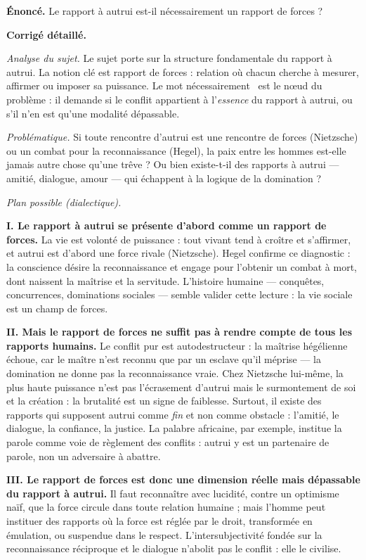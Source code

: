 \documentclass[11pt]{article}
\begin{document}
\begin{exoresolu}
\textbf{Énoncé.} Le rapport à autrui est-il nécessairement un rapport de forces ?

\tcblower
\textbf{Corrigé détaillé.}

\emph{Analyse du sujet.} Le sujet porte sur la structure fondamentale du rapport à autrui. La notion clé est \guillemotleft rapport de forces \guillemotright : relation où chacun cherche à mesurer, affirmer ou imposer sa puissance. Le mot \guillemotleft nécessairement \guillemotright\ est le nœud du problème : il demande si le conflit appartient à l'\emph{essence} du rapport à autrui, ou s'il n'en est qu'une modalité dépassable.

\emph{Problématique.} Si toute rencontre d'autrui est une rencontre de forces (Nietzsche) ou un combat pour la reconnaissance (Hegel), la paix entre les hommes est-elle jamais autre chose qu'une trêve ? Ou bien existe-t-il des rapports à autrui — amitié, dialogue, amour — qui échappent à la logique de la domination ?

\emph{Plan possible (dialectique).}

\textbf{I. Le rapport à autrui se présente d'abord comme un rapport de forces.} La vie est volonté de puissance : tout vivant tend à croître et s'affirmer, et autrui est d'abord une force rivale (Nietzsche). Hegel confirme ce diagnostic : la conscience désire la reconnaissance et engage pour l'obtenir un combat à mort, dont naissent la maîtrise et la servitude. L'histoire humaine — conquêtes, concurrences, dominations sociales — semble valider cette lecture : la vie sociale est un champ de forces.

\textbf{II. Mais le rapport de forces ne suffit pas à rendre compte de tous les rapports humains.} Le conflit pur est autodestructeur : la maîtrise hégélienne échoue, car le maître n'est reconnu que par un esclave qu'il méprise — la domination ne donne pas la reconnaissance vraie. Chez Nietzsche lui-même, la plus haute puissance n'est pas l'écrasement d'autrui mais le surmontement de soi et la création : la brutalité est un signe de faiblesse. Surtout, il existe des rapports qui supposent autrui comme \emph{fin} et non comme obstacle : l'amitié, le dialogue, la confiance, la justice. La palabre africaine, par exemple, institue la parole comme voie de règlement des conflits : autrui y est un partenaire de parole, non un adversaire à abattre.

\textbf{III. Le rapport de forces est donc une dimension réelle mais dépassable du rapport à autrui.} Il faut reconnaître avec lucidité, contre un optimisme naïf, que la force circule dans toute relation humaine ; mais l'homme peut instituer des rapports où la force est réglée par le droit, transformée en émulation, ou suspendue dans le respect. L'intersubjectivité fondée sur la reconnaissance réciproque et le dialogue n'abolit pas le conflit : elle le civilise.


\end{exoresolu}
\end{document}
